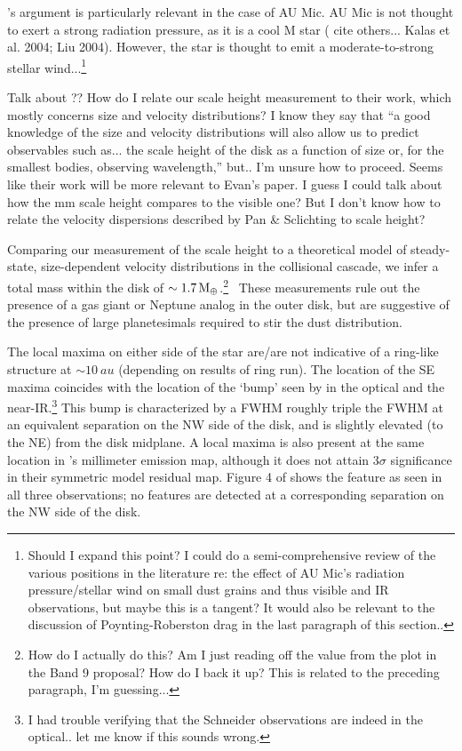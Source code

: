 \documentclass[12pt,oneside]{article}
\begin{document}
\cite{thebault09}'s argument is particularly relevant in the case of AU Mic. 
AU Mic is not thought to exert a strong radiation pressure, as it is a cool M star (\cite{krist05} cite others... Kalas et al. 2004; Liu 2004).
However, the star is thought to emit a moderate-to-strong stellar wind...\footnote{Should I expand this point? I could do a semi-comprehensive review of the various positions in the literature re: the effect of AU Mic's radiation pressure/stellar wind on small dust grains and thus visible and IR observations, but maybe this is a tangent? It would also be relevant to the discussion of Poynting-Roberston drag in the last paragraph of this section..}

Talk about \cite{pan&schlichting12}?? How do I relate our scale height measurement to their work, which mostly concerns size and velocity distributions? I know they say that ``a good knowledge of the size and velocity distributions will also allow us to predict observables such as... the scale height of the disk as a function of size or, for the smallest bodies, observing wavelength,'' but.. I'm unsure how to proceed. Seems like their work will be more relevant to Evan's paper. I guess I could talk about how the mm scale height compares to the visible one? But I don't know how to relate the velocity dispersions described by Pan \& Sclichting to scale height?

Comparing our measurement of the scale height to a theoretical model of steady-state, size-dependent velocity distributions in the collisional cascade, we infer a total mass within the disk of $\sim \SI{1.7}{M_\oplus}$.\footnote{How do I actually do this? Am I just reading off the value from the plot in the Band 9 proposal? How do I back it up? This is related to the preceding paragraph, I'm guessing...} 
These measurements rule out the presence of a gas giant or Neptune analog in the outer disk, but are suggestive of the presence of large planetesimals required to stir the dust distribution.

The local maxima on either side of the star are/are not indicative of a ring-like structure at $\sim \SI{10}{au}$ (depending on results of ring run). 
The location of the SE maxima coincides with the location of the `bump' seen by \cite{schneider14} in the optical and \cite{wang15} the near-IR.\footnote{I had trouble verifying that the Schneider observations are indeed in the optical.. let me know if this sounds wrong.} 
This bump is characterized by a FWHM roughly triple the FWHM at an equivalent separation on the NW side of the disk, and is slightly elevated (to the NE) from the disk midplane. 
A local maxima is also present at the same location in \cite{macgregor13}'s millimeter emission map, although it does not attain $3 \sigma$ significance in their symmetric model residual map.
Figure 4 of \cite{wang15} shows the feature as seen in all three observations; no features are detected at a corresponding separation on the NW side of the disk.
\end{document}
